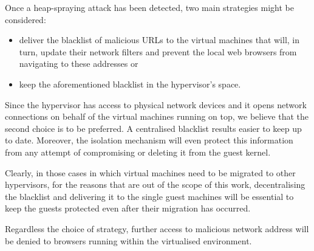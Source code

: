 Once a heap-spraying attack has been detected, two main strategies might be considered:  

\begin{itemize}
\item deliver the blacklist of malicious URLs to the virtual machines that will, in turn, update their network filters and prevent the local web browsers from navigating to these addresses or 

\item keep the aforementioned blacklist in the hypervisor's space. 
\end{itemize}

Since the hypervisor has access to physical network devices and it opens network connections on behalf of the virtual machines running on top, we believe that the second choice is to be preferred. 
A centralised blacklist results easier to keep up to date. Moreover, the isolation mechanism will even protect this information from any attempt of compromising or deleting it from the guest kernel.
 
Clearly, in those cases in which virtual machines need to be migrated to other hypervisors, for the reasons that are out of the scope of this work, decentralising the blacklist and delivering it to the single guest machines will be essential to keep the guests protected even after their migration has occurred.

Regardless the choice of strategy, further access to malicious network address will be denied to browsers running within the virtualised environment.



%



